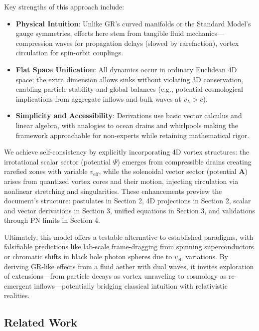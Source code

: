 \documentclass{article}
\begin{document}
Key strengths of this approach include:
\begin{itemize}
    \item \textbf{Physical Intuition}: Unlike GR's curved manifolds or the Standard Model's gauge symmetries, effects here stem from tangible fluid mechanics---compression waves for propagation delays (slowed by rarefaction), vortex circulation for spin-orbit couplings.
    \item \textbf{Flat Space Unification}: All dynamics occur in ordinary Euclidean 4D space; the extra dimension allows sinks without violating 3D conservation, enabling particle stability and global balances (e.g., potential cosmological implications from aggregate inflows and bulk waves at $v_L > c$).
    \item \textbf{Simplicity and Accessibility}: Derivations use basic vector calculus and linear algebra, with analogies to ocean drains and whirlpools making the framework approachable for non-experts while retaining mathematical rigor.
\end{itemize}

We achieve self-consistency by explicitly incorporating 4D vortex structures: the irrotational scalar sector (potential $\Psi$) emerges from compressible drains creating rarefied zones with variable $v_{\text{eff}}$, while the solenoidal vector sector (potential $\mathbf{A}$) arises from quantized vortex cores and their motion, injecting circulation via nonlinear stretching and singularities. These enhancements preview the document's structure: postulates in Section 2, 4D projections in Section 2, scalar and vector derivations in Section 3, unified equations in Section 3, and validations through PN limits in Section 4.

Ultimately, this model offers a testable alternative to established paradigms, with falsifiable predictions like lab-scale frame-dragging from spinning superconductors or chromatic shifts in black hole photon spheres due to $v_{\text{eff}}$ variations. By deriving GR-like effects from a fluid aether with dual waves, it invites exploration of extensions---from particle decays as vortex unraveling to cosmology as re-emergent inflows---potentially bridging classical intuition with relativistic realities.

\subsection{Related Work}
\end{document}
